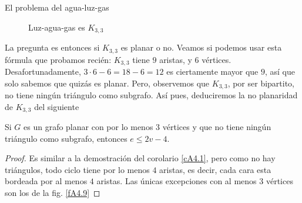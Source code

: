 \begin{section}{El problema del agua-luz-gas}
\begin{figure}[ht]
    \begin{center}
    \end{center}
    \caption{Luz-agua-gas es $K_{3,3}$} \label{fA4.8}
\end{figure}

La pregunta es entonces si $K_{3,3}$ es planar o no. Veamos si podemos usar esta fórmula que probamos recién: $K_{3,3}$ tiene $9$ aristas, y $6$ vértices. Desafortunadamente, $3 \cdot 6-6=18-6=12$ es ciertamente mayor que $9$, así que solo sabemos que quizás es planar. Pero, observemos que $K_{3,3}$, por ser bipartito, no tiene ningún triángulo como subgrafo. Así pues, deduciremos la no planaridad de $K_{3,3}$ del si\-guien\-te

\begin{corolario}\label{cA4.2} Si $G$ es un grafo planar con por lo menos $3$ vértices y que no tiene ningún triángulo como subgrafo, entonces $e\le 2v-4$.
\end{corolario}
\begin{proof} Es similar a la demostración del corolario \ref{cA4.1}, pero como no hay triángulos, todo ciclo tiene por lo menos $4$ aristas, es decir, cada cara esta bordeada por al menos $4$ aristas. Las únicas
excepciones con al menos $3$ vértices son los de la fig. \ref{fA4.9}


\end{proof}
\end{section}
